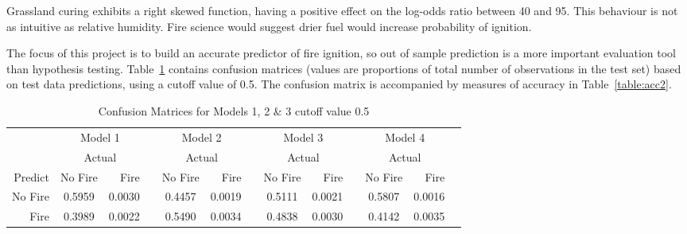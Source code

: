 \documentclass[11pt,a4paper]{article}
\begin{document}
Grassland curing exhibits a right skewed function, having a positive effect on the log-odds ratio between 40 and 95. This behaviour is not as intuitive as relative humidity. Fire science would suggest drier fuel would increase probability of ignition.


The focus of this project is to build an accurate predictor of fire ignition, so out of sample prediction is a more important evaluation tool than hypothesis testing. Table~\ref{table:cm2} contains confusion matrices (values are proportions of total number of observations in the test set) based on test data predictions, using a cutoff value of 0.5. The confusion matrix is accompanied by measures of accuracy in Table~\ref{table:acc2}.


\begin{table}
  \centering
  \begin{tabular}{rcrrcrrcrrcrr}
    & \multicolumn{2}{c}{Model 1} &
    & \multicolumn{2}{c}{Model 2} &
    & \multicolumn{2}{c}{Model 3} &
    & \multicolumn{2}{c}{Model 4}\\
    \cmidrule{2-3}\cmidrule{5-6}\cmidrule{8-9}\cmidrule{11-12}
    & \multicolumn{2}{c}{Actual} &
    & \multicolumn{2}{c}{Actual} &
    & \multicolumn{2}{c}{Actual} &
    & \multicolumn{2}{c}{Actual} \\
    Predict & No Fire & Fire   & & No Fire & Fire   & & No Fire & Fire   & & No Fire   & Fire\\
    \cmidrule{2-3} \cmidrule{5-6}\cmidrule{8-9}\cmidrule{11-12}
    No Fire & 0.5959  & 0.0030 & & 0.4457  & 0.0019 & & 0.5111  & 0.0021 & & 0.5807    & 0.0016 \\
    Fire    & 0.3989  & 0.0022 & & 0.5490  & 0.0034 & & 0.4838  & 0.0030 & & 0.4142    & 0.0035 \\
    \cmidrule{2-3} \cmidrule{5-6}\cmidrule{8-9}\cmidrule{11-12}
  \end{tabular}
  \caption{Confusion Matrices for Models 1, 2 \& 3 cutoff value 0.5}
  \label{table:cm2}
\end{table}
\end{document}
